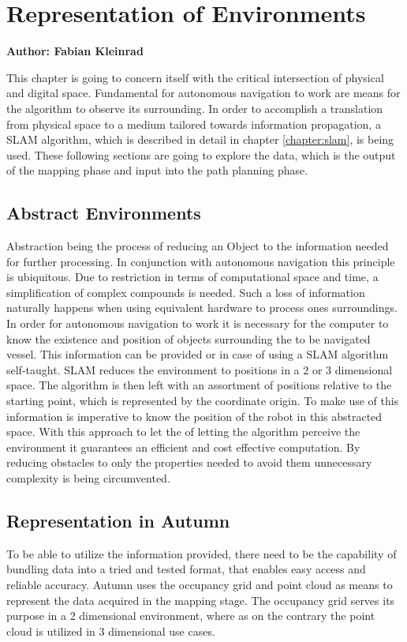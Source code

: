 \chapter{Representation of Environments}

\textbf{Author: Fabian Kleinrad} 

This chapter is going to concern itself with the critical intersection of physical and digital space. Fundamental for autonomous navigation to work are means for the algorithm to observe its surrounding. In order to accomplish a translation from physical space to a medium tailored towards information propagation, a SLAM algorithm, which is described in detail in chapter \ref{chapter:slam}, is being used. These following sections are going to explore the data, which is the output of the mapping phase and input into the path planning phase.

\section{Abstract Environments}

Abstraction being the process of reducing an Object to the information needed for further processing. In conjunction with autonomous navigation this principle is ubiquitous. Due to restriction in terms of computational space and time, a simplification of complex compounds is needed. Such a loss of information naturally happens when using equivalent hardware to process ones surroundings.\newline
In order for autonomous navigation to work it is necessary for the computer to know the existence and position of objects surrounding the to be navigated vessel. This information can be provided or in case of using a SLAM algorithm self-taught. SLAM reduces the environment to positions in a 2 or 3 dimensional space. The algorithm is then left with an assortment of positions relative to the starting point, which is represented by the coordinate origin. To make use of this information is imperative to know the position of the robot in this abstracted space.\newline
With this approach to let the of letting the algorithm perceive the environment it guarantees an efficient and cost effective computation. By reducing obstacles to only the properties needed to avoid them unnecessary complexity is being circumvented.      

\section{Representation in Autumn}
To be able to utilize the information provided, there need to be the capability of bundling data into a tried and tested format, that enables easy access and reliable accuracy.\newline
Autumn uses the occupancy grid and point cloud as means to represent the data acquired in the mapping stage. The occupancy grid serves its purpose in a 2 dimensional environment, where as on the contrary the point cloud is utilized in 3 dimensional use cases.

